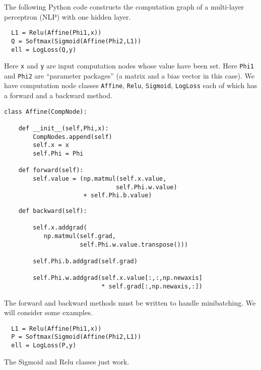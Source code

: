 {
\medskip

The following Python code constructs the computation graph of a multi-layer perceptron (NLP) with one hidden layer.

\vfill
\begin{verbatim}
  L1 = Relu(Affine(Phi1,x))
  Q = Softmax(Sigmoid(Affine(Phi2,L1))
  ell = LogLoss(Q,y)
\end{verbatim}

\vfill
Here {\tt x} and {\tt y} are input computation nodes
whose value have been set.
Here {\tt Phi1} and {\tt Phi2} are ``parameter packages'' (a matrix and a bias vector in this case).
We have computation node classes {\tt Affine}, {\tt Relu}, {\tt Sigmoid}, {\tt LogLoss} each of which has
a forward and a backward method.

\vfill
\eject
\begin{verbatim}
class Affine(CompNode):

    def __init__(self,Phi,x):
        CompNodes.append(self)
        self.x = x
        self.Phi = Phi

    def forward(self):
        self.value = (np.matmul(self.x.value,
                               self.Phi.w.value)
                      + self.Phi.b.value)
\end{verbatim}
\vfill
\eject
\vfill
\begin{verbatim}
    def backward(self):

        self.x.addgrad(
           np.matmul(self.grad,
                     self.Phi.w.value.transpose()))

        self.Phi.b.addgrad(self.grad)

        self.Phi.w.addgrad(self.x.value[:,:,np.newaxis]
                           * self.grad[:,np.newaxis,:])
\end{verbatim}


The forward and backward methods must be written to handle minibatching.  We will consider some examples.



\vfill
\begin{verbatim}
  L1 = Relu(Affine(Phi1,x))
  P = Softmax(Sigmoid(Affine(Phi2,L1))
  ell = LogLoss(P,y)
\end{verbatim}



The Sigmoid and Relu classes just work.

}
